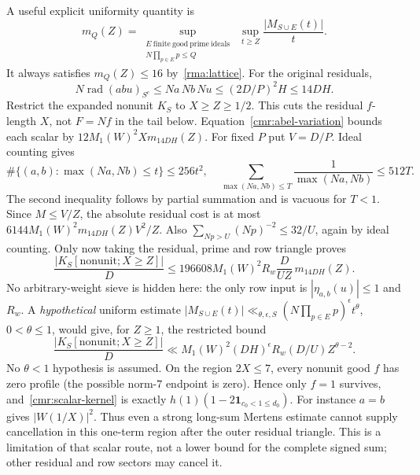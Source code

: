 \documentclass[11pt]{article}
\theoremstyle{definition}\newtheorem{definition}[theorem]{Definition}
\theoremstyle{remark}\newtheorem{remark}[theorem]{Remark}
\begin{document}
A useful explicit uniformity quantity is
\[
 m_Q(Z)=\sup_{\substack{E\ \mathrm{finite\ good\ prime\ ideals}\\
                       N\prod_{p\in E}p\le Q}}
         \ \sup_{t\ge Z}\frac{|M_{S\cup E}(t)|}{t}.
\]
It always satisfies $m_Q(Z)\le16$ by~\eqref{rma:lattice}.
For the original residuals,
\[
 N\operatorname{rad}(abu)_{S^c}
 \le Na\,Nb\,Nu\le(2D/P)^2H\le14DH.
\]
Restrict the expanded nonunit $K_S$ to $X\ge Z\ge1/2$.
This cuts the residual $f$-length $X$, not $F=Nf$ in the tail below.
Equation~\eqref{cmr:abel-variation} bounds each scalar by
$12M_1(W)^2Xm_{14DH}(Z)$.
For fixed $P$ put $V=D/P$. Ideal counting gives
\[
 \#\{(a,b):\max(Na,Nb)\le t\}\le256t^2,
 \quad
 \sum_{\max(Na,Nb)\le T}\frac1{\max(Na,Nb)}\le512T.
\]
The second inequality follows by partial summation and is vacuous for
$T<1$. Since $M\le V/Z$, the absolute residual cost is at most
$6144M_1(W)^2m_{14DH}(Z)V^2/Z$.
Also $\sum_{Np>U}(Np)^{-2}\le32/U$, again by ideal counting.
Only now taking the residual, prime and row triangle proves
\begin{equation}\label{cmr:mertens-budget}
 \frac{|K_S[\mathrm{nonunit};X\ge Z]|}D
 \le196608M_1(W)^2R_w\frac D{UZ}\,m_{14DH}(Z).
\end{equation}
No arbitrary-weight sieve is hidden here: the only row input is
$|\eta_{a,b}(u)|\le1$ and $R_w$.
A \emph{hypothetical} uniform estimate
$|M_{S\cup E}(t)|\ll_{\theta,\epsilon,S}
 (N\prod_{p\in E}p)^\epsilon t^\theta$, $0<\theta\le1$,
would give, for $Z\ge1$, the restricted bound
\[
 \frac{|K_S[\mathrm{nonunit};X\ge Z]|}D
 \ll M_1(W)^2(DH)^\epsilon R_w(D/U)Z^{\theta-2}.
\]
No $\theta<1$ hypothesis is assumed.
On the region $2X\le7$, every nonunit good $f$ has zero profile
(the possible norm-$7$ endpoint is zero). Hence only $f=1$ survives,
and~\eqref{cmr:scalar-kernel} is exactly
$h(1)(1-2\mathbf1_{c_0<1\le d_0})$.
For instance $a=b$ gives $|W(1/X)|^2$.
Thus even a strong long-sum Mertens estimate cannot supply cancellation
in this one-term region after the outer residual triangle. This is a
limitation of that scalar route, not a lower bound for the complete
signed sum; other residual and row sectors may cancel it.
\end{document}

